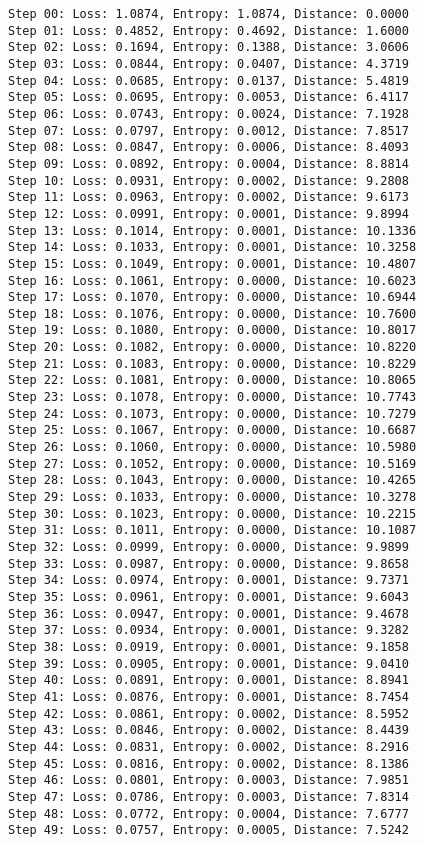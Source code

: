 \documentclass[11pt]{article}
\begin{document}
    \begin{Verbatim}[commandchars=\\\{\}]
Step 00: Loss: 1.0874, Entropy: 1.0874, Distance: 0.0000
Step 01: Loss: 0.4852, Entropy: 0.4692, Distance: 1.6000
Step 02: Loss: 0.1694, Entropy: 0.1388, Distance: 3.0606
Step 03: Loss: 0.0844, Entropy: 0.0407, Distance: 4.3719
Step 04: Loss: 0.0685, Entropy: 0.0137, Distance: 5.4819
Step 05: Loss: 0.0695, Entropy: 0.0053, Distance: 6.4117
Step 06: Loss: 0.0743, Entropy: 0.0024, Distance: 7.1928
Step 07: Loss: 0.0797, Entropy: 0.0012, Distance: 7.8517
Step 08: Loss: 0.0847, Entropy: 0.0006, Distance: 8.4093
Step 09: Loss: 0.0892, Entropy: 0.0004, Distance: 8.8814
Step 10: Loss: 0.0931, Entropy: 0.0002, Distance: 9.2808
Step 11: Loss: 0.0963, Entropy: 0.0002, Distance: 9.6173
Step 12: Loss: 0.0991, Entropy: 0.0001, Distance: 9.8994
Step 13: Loss: 0.1014, Entropy: 0.0001, Distance: 10.1336
Step 14: Loss: 0.1033, Entropy: 0.0001, Distance: 10.3258
Step 15: Loss: 0.1049, Entropy: 0.0001, Distance: 10.4807
Step 16: Loss: 0.1061, Entropy: 0.0000, Distance: 10.6023
Step 17: Loss: 0.1070, Entropy: 0.0000, Distance: 10.6944
Step 18: Loss: 0.1076, Entropy: 0.0000, Distance: 10.7600
Step 19: Loss: 0.1080, Entropy: 0.0000, Distance: 10.8017
Step 20: Loss: 0.1082, Entropy: 0.0000, Distance: 10.8220
Step 21: Loss: 0.1083, Entropy: 0.0000, Distance: 10.8229
Step 22: Loss: 0.1081, Entropy: 0.0000, Distance: 10.8065
Step 23: Loss: 0.1078, Entropy: 0.0000, Distance: 10.7743
Step 24: Loss: 0.1073, Entropy: 0.0000, Distance: 10.7279
Step 25: Loss: 0.1067, Entropy: 0.0000, Distance: 10.6687
Step 26: Loss: 0.1060, Entropy: 0.0000, Distance: 10.5980
Step 27: Loss: 0.1052, Entropy: 0.0000, Distance: 10.5169
Step 28: Loss: 0.1043, Entropy: 0.0000, Distance: 10.4265
Step 29: Loss: 0.1033, Entropy: 0.0000, Distance: 10.3278
Step 30: Loss: 0.1023, Entropy: 0.0000, Distance: 10.2215
Step 31: Loss: 0.1011, Entropy: 0.0000, Distance: 10.1087
Step 32: Loss: 0.0999, Entropy: 0.0000, Distance: 9.9899
Step 33: Loss: 0.0987, Entropy: 0.0000, Distance: 9.8658
Step 34: Loss: 0.0974, Entropy: 0.0001, Distance: 9.7371
Step 35: Loss: 0.0961, Entropy: 0.0001, Distance: 9.6043
Step 36: Loss: 0.0947, Entropy: 0.0001, Distance: 9.4678
Step 37: Loss: 0.0934, Entropy: 0.0001, Distance: 9.3282
Step 38: Loss: 0.0919, Entropy: 0.0001, Distance: 9.1858
Step 39: Loss: 0.0905, Entropy: 0.0001, Distance: 9.0410
Step 40: Loss: 0.0891, Entropy: 0.0001, Distance: 8.8941
Step 41: Loss: 0.0876, Entropy: 0.0001, Distance: 8.7454
Step 42: Loss: 0.0861, Entropy: 0.0002, Distance: 8.5952
Step 43: Loss: 0.0846, Entropy: 0.0002, Distance: 8.4439
Step 44: Loss: 0.0831, Entropy: 0.0002, Distance: 8.2916
Step 45: Loss: 0.0816, Entropy: 0.0002, Distance: 8.1386
Step 46: Loss: 0.0801, Entropy: 0.0003, Distance: 7.9851
Step 47: Loss: 0.0786, Entropy: 0.0003, Distance: 7.8314
Step 48: Loss: 0.0772, Entropy: 0.0004, Distance: 7.6777
Step 49: Loss: 0.0757, Entropy: 0.0005, Distance: 7.5242
    \end{Verbatim}
\end{document}
